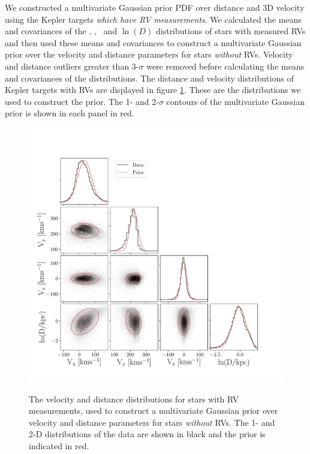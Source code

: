We constructed a multivariate Gaussian prior PDF over distance and 3D velocity
using the Kepler targets {\it which have RV measurements}.
We calculated the means and covariances of the \vx, \vy, \vz\ and $\ln(D)$
distributions of stars with measured RVs and then used these means and
covariances to construct a multivariate Gaussian prior over the velocity and
distance parameters for stars {\it without} RVs.
Velocity and distance outliers greater than 3-$\sigma$ were removed before
calculating the means and covariances of the distributions.
The distance and velocity distributions of Kepler targets with RVs are
displayed in figure \ref{fig:prior_distributions_2D}.
These are the distributions we used to construct the prior.
The 1- and 2-$\sigma$ contours of the multivariate Gaussian prior is shown in
each panel in red.
\begin{figure}[ht!]
\caption{
The velocity and distance distributions for stars with RV measurements,
    used to construct a multivariate Gaussian prior over velocity and
    distance parameters for stars {\it without} RVs.
The 1- and 2-D distributions of the data are shown in black and the prior is
    indicated in red.
}
  \centering
    \includegraphics[width=.8\textwidth]{prior_distributions_2D}
\label{fig:prior_distributions_2D}
\end{figure}

